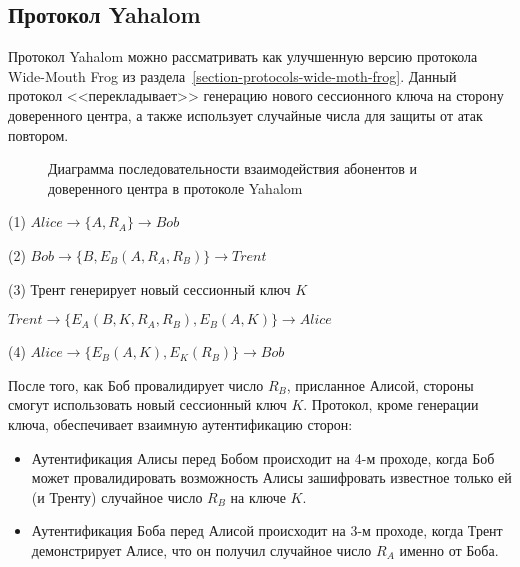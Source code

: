 \subsection{Протокол Yahalom}\label{section-protocols-yahalom}

Протокол Yahalom можно рассматривать как улучшенную версию протокола Wide-Mouth Frog из раздела~\ref{section-protocols-wide-moth-frog}. Данный протокол <<перекладывает>> генерацию нового сессионного ключа на сторону доверенного центра, а также использует случайные числа для защиты от атак повтором.

\begin{figure}
	\centering
	\begin{sequencediagram}

	\end{sequencediagram}
	\caption{Диаграмма последовательности взаимодействия абонентов и доверенного центра в протоколе Yahalom\label{fig:key_distribution-yahalom}}
\end{figure}

\begin{protocol}
	\item[(1)] $Alice \to \{ A, R_A \} \to Bob$
	\item[(2)] $Bob \to \{ B, E_B( A, R_A, R_B ) \} \to Trent$
	\item[(3)] Трент генерирует новый сессионный ключ $K$
	\item[{}] $Trent \to \{ E_A( B, K, R_A, R_B ), E_B(A, K) \} \to Alice$
	\item[(4)] $Alice \to \{ E_B( A, K ), E_K( R_B ) \} \to Bob$
\end{protocol}

После того, как Боб провалидирует число $R_B$, присланное Алисой, стороны смогут использовать новый сессионный ключ $K$. Протокол, кроме генерации ключа, обеспечивает взаимную аутентификацию сторон:

\begin{itemize}
    \item Аутентификация Алисы перед Бобом происходит на 4-м проходе, когда Боб может провалидировать возможность Алисы зашифровать известное только ей (и Тренту) случайное число $R_B$ на ключе $K$.
    \item Аутентификация Боба перед Алисой происходит на 3-м проходе, когда Трент демонстрирует Алисе, что он получил случайное число $R_A$ именно от Боба.
\end{itemize}


